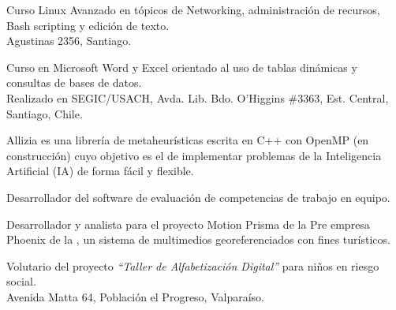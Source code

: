 \documentclass[11pt,letterpaper,roman]{moderncv}
\begin{document}
 {\tchr} {\ipgamma} {\stgo} {}
{Curso \sence Linux Avanzado en tópicos de Networking, administración de
recursos, Bash scripting y edición de texto. \\ Agustinas 2356, Santiago.}

 {\tchr} {\otecnewline} {\stgo} {}
{Curso \sence en Microsoft Word y Excel orientado al uso de tablas dinámicas y
consultas de bases de datos. \\ Realizado en SEGIC/USACH, Avda. Lib. Bdo. O'Higgins \#3363, Est. Central, Santiago, Chile.}

{Allizia es una librería de metaheurísticas escrita en C++ con OpenMP (en
construcción) cuyo objetivo es el de implementar problemas de la Inteligencia
Artificial (IA) de forma fácil y flexible. }

 { } {} {}
{Desarrollador del software de evaluación de competencias de trabajo en equipo.}



 {\sd} { } {} {}
{Desarrollador y analista para el proyecto Motion Prisma de la Pre empresa
Phoenix de la , un sistema de multimedios georeferenciados con fines
turísticos.}

 {\tchr} {\ernestoquiroz } {\valpo} {}
{Volutario del proyecto \textit{``Taller de Alfabetizaci\'on Digital''}
para niños en riesgo social. \\ Avenida Matta 64, Población el Progreso,
Valparaíso.}
	
	
%


%	
%	
%	
%
%	
\end{document}
